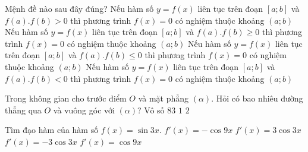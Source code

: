 \begin{ex}%
	Mệnh đề nào sau đây đúng?
	\choice
	{Nếu hàm số $y=f(x)$ liên tục trên đoạn $[a;b]$ và $f(a).f(b)>0$ thì phương trình $f(x)=0$ có nghiệm thuộc khoảng $(a;b)$}
	{Nếu hàm số $y=f(x)$ liên tục trên đoạn $[a;b]$ và $f(a).f(b) \ge 0$ thì phương trình $f(x)=0$ có nghiệm thuộc khoảng $(a;b)$}
	{Nếu hàm số $y=f(x)$ liên tục trên đoạn $[a;b]$ và $f(a).f(b) \le 0$ thì phương trình $f(x)=0$ có nghiệm thuộc khoảng $(a;b)$}
	{\True Nếu hàm số $y=f(x)$ liên tục trên đoạn $[a;b]$ và $f(a).f(b) < 0$ thì phương trình $f(x)=0$ có nghiệm thuộc khoảng $(a;b)$}
	\loigiai{
		
	}
\end{ex}

\begin{ex}%
	Trong không gian cho trước điểm $O$ và mặt phẳng $(\alpha)$. Hỏi có bao nhiêu đường thẳng qua $O$ và vuông góc với $(\alpha)$?
\choice
{Vô số}
{$83$}
{\True $1$}
{$2$}
\end{ex}

\begin{ex}%
	Tìm đạo hàm của hàm số $f(x)=\sin 3x$.
\choice
	{$f'(x)=-\cos 9x$}
	{\True $f'(x)=3\cos 3x$}
	{$f'(x)=-3\cos 3x$}
	{$f'(x)= \cos 9x$}
\end{ex}

